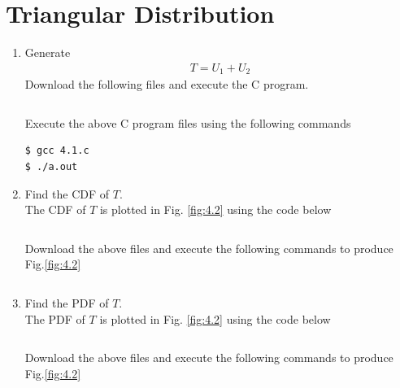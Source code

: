 \documentclass[journal,12pt,twocolumn]{IEEEtran}
\renewcommand\thesection{\arabic{section}}
\begin{document}
\section{Triangular Distribution}
\begin{enumerate}[label=\thesection.\arabic*
,ref=\thesection.\theenumi]
\item Generate
    \begin{align}
        T=U_1+U_2
    \end{align}
    \solution Download the following files and execute the  C program.
\begin{lstlisting}

\end{lstlisting}
Execute the above C program files using the following commands
\begin{lstlisting}
$ gcc 4.1.c
$ ./a.out
\end{lstlisting}

\item Find the CDF of $T$.\\
\solution The CDF of $T$ is plotted in Fig. \ref{fig:4.2} using the code below
\begin{lstlisting}

\end{lstlisting}
Download the above files and execute the following commands to produce Fig.\ref{fig:4.2}
\begin{lstlisting}

\end{lstlisting}

\item Find the PDF of $T$.\\
\solution The PDF of $T$ is plotted in Fig. \ref{fig:4.2} using the code below
\begin{lstlisting}

\end{lstlisting}
Download the above files and execute the following commands to produce Fig.\ref{fig:4.2}
\begin{lstlisting}

\end{lstlisting}


\end{enumerate}
\end{document}
